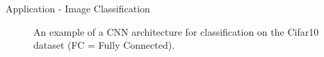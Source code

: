 \begin{vbframe}{Application - Image Classification}
\begin{figure}
    \end{figure}
\framebreak
    \begin{figure}
        \centering
        \caption{An example of a CNN architecture for classification on the Cifar10 dataset (FC = Fully Connected). }
    \end{figure}  
\end{vbframe}

